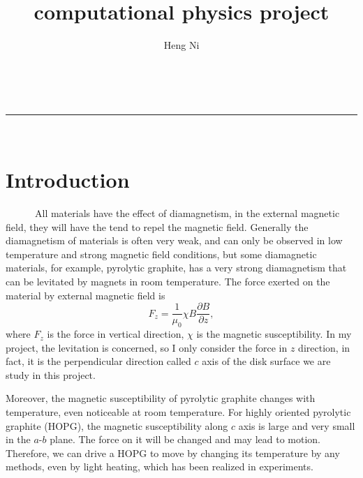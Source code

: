 \documentclass[a4paper,11pt]{article}
\makeatletter
\newcommand{\linia}{\rule{\linewidth}{0.5pt}}
\theoremstyle{mytheor}
\renewcommand{\maketitle}{
\begin{center}
\vspace{2ex}
{\huge \textsc{\@title}}
\vspace{1ex}
\\
\linia\\
\@author \hfill \@date
\vspace{4ex}
\end{center}
}
\makeatother
\begin{document}
\title{computational physics project}

\author{Heng Ni}

\maketitle

\section{Introduction}

\ \ \ \ \ \ All materials have the effect of diamagnetism, in the external magnetic field, they will have the tend to repel the magnetic field. Generally the diamagnetism of materials is often very weak, and can only be observed in low temperature and strong magnetic field conditions, but some diamagnetic materials, for example, pyrolytic graphite, has a very strong diamagnetism that can be levitated by magnets in room temperature. The force exerted on the material by external magnetic field is 
\begin{equation}
F_z = \frac{1}{\mu_0}\chi B \frac{\partial B}{\partial z},
\end{equation}
where $F_z$ is the force in vertical direction, $\chi$ is the magnetic susceptibility. In my project, the levitation is concerned, so I only consider the force in $z$ direction, in fact, it is the perpendicular direction called $c$ axis of the disk surface we are study in this project.

Moreover, the magnetic susceptibility of pyrolytic graphite changes with temperature, even noticeable at room temperature. For highly oriented pyrolytic graphite (HOPG), the magnetic susceptibility along $c$ axis is large and very small in the $a$-$b$ plane. The force on it will be changed and may lead to motion. Therefore, we can drive a HOPG to move by changing its temperature by any methods, even by light heating, which has been realized in experiments. 
\end{document}
